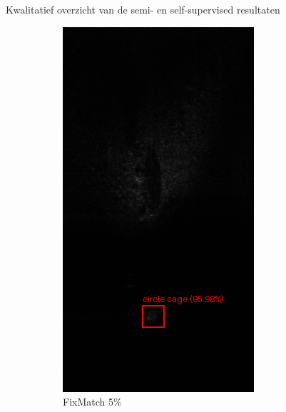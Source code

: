 \documentclass[aspectratio=169]{beamer}
\begin{document}
\begin{frame}{Kwalitatief overzicht van de semi- en self-supervised resultaten}
\begin{figure}
\begin{subfigure}{.2\textwidth}
                \includegraphics[width=0.9\linewidth]{1_fixmatch_5pct.png}
                \caption{FixMatch 5\%}
            \end{subfigure}%
            \begin{subfigure}{.2\textwidth}
                \centering
                \captionsetup{justification=centering}

\end{subfigure}
\end{figure}
\end{frame}
\end{document}
